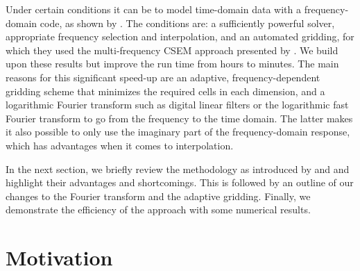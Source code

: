 \documentclass[extra, camera,%
    final,       %
]{gji}
\begin{document}
Under certain conditions it can be 
to model time-domain data with a frequency-domain code, as shown by
\cite{GEO.08.Mulder}. 
\cite{GEO.04.Commer, GEO.07.Maao}
\cite[e.g., ][]{RS.94.Druskin}  The conditions
are: a sufficiently powerful solver, appropriate frequency selection and
interpolation, and an automated gridding, for which they used the
multi-frequency CSEM approach presented by \cite{GEO.07.Plessix}. We build upon
these results but improve the run time from hours to minutes. The main reasons
for this significant speed-up are an adaptive, frequency-dependent gridding
scheme that minimizes the required cells in each dimension, and a logarithmic
Fourier transform such as digital linear filters \citep[DLF, ][]{GP.71.Ghosh}
or the logarithmic fast Fourier transform \citep[FFTLog, ][]{RAS.00.Hamilton}
to go from the frequency to the time domain. The latter makes it also possible
to only use the imaginary part of the frequency-domain response, which has
advantages when it comes to interpolation.

 In the
next section, we briefly review the methodology as introduced by
\cite{GEO.07.Plessix} and \cite{GEO.08.Mulder} and highlight their advantages
and shortcomings. This is followed by an outline of our changes to the Fourier
transform and the adaptive gridding. Finally, we demonstrate the efficiency of
the approach with some numerical results.


\section{Motivation}  %
\end{document}
